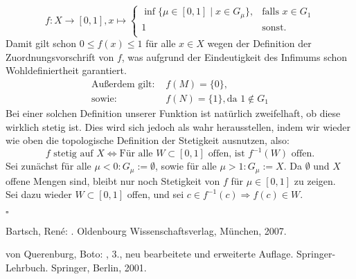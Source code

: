 \documentclass[11pt,leqno]{article}
\begin{document}
\[f:X \rightarrow [0,1], x \mapsto \begin{cases}
    \inf \{\mu \in [0,1] \mid x \in G_\mu\},  & \text{falls }x \in G_1\\
    1 & \text{sonst.} \\
\end{cases} \]
Damit gilt schon $0 \leq f(x) \leq 1$ für alle $x \in X$ wegen der Definition der Zuordnungsvorschrift von $f$, was aufgrund der Eindeutigkeit des
Infimums schon Wohldefiniertheit garantiert.
\begin{align*}
    \text{Außerdem gilt: } & f(M) = \{0\}, \\
    \text{sowie: } &         f(N) = \{1\}, \text{da } 1 \notin G_1 
\end{align*}
Bei einer solchen Definition unserer Funktion ist natürlich zweifelhaft, ob diese wirklich stetig ist. Dies wird sich jedoch als wahr herausstellen,
indem wir wieder wie oben die topologische Definition der Stetigkeit ausnutzen, also:
\[f \text{ stetig auf } X \Leftrightarrow \text{Für alle } W \subset [0,1] \text { offen, ist } f^{-1}(W) \text{ offen.}\]
Sei zunächst für alle $\mu < 0: G_\mu := \emptyset$, sowie für alle $\mu > 1: G_\mu := X.$
Da $\emptyset$ und $X$ offene Mengen sind, bleibt nur noch Stetigkeit von $f$ für $\mu \in [0,1]$ zu zeigen. \\
Sei dazu wieder $W \subset [0,1]$ offen, und sei $c \in f^{-1}(c) \Rightarrow f(c) \in W.$ 

\begin{flushright}
    $\square$
\end{flushright}



\begin{thebibliography}{99}

    {\sc Bartsch, René:}
    .
    \newblock Oldenbourg Wissenschaftsverlag, München, 2007.
    
    
    {\sc von Querenburg, Boto:}
    , 3., neu bearbeitete und erweiterte Auflage.
    \newblock Springer-Lehrbuch. Springer, Berlin, 2001.
\end{thebibliography}
\end{document}
